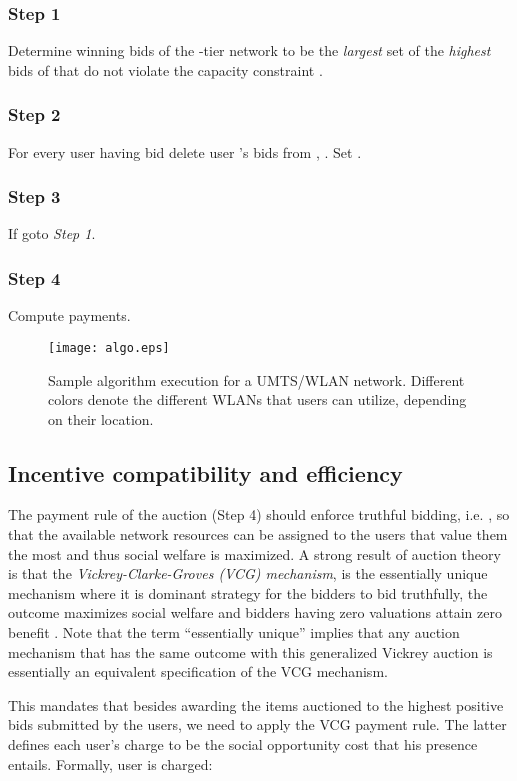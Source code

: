 \documentclass[a4paper]{article}
\begin{document}
\subsubsection*{Step 1} Determine winning bids  of the -tier network  
to be the {\em largest} set of the {\em highest} bids of  that do not violate 
the capacity constraint .
\subsubsection*{Step 2} For every user  having bid  delete 
user 's bids from , .  
Set .
\subsubsection*{Step 3} If  goto {\em Step 1}. 
\subsubsection*{Step 4} Compute payments.

\begin{figure}[htbp]
	\centering\texttt{[image: algo.eps]}
	\caption{Sample algorithm execution for a UMTS/WLAN network. Different
	colors denote the different WLANs that users can utilize, depending on their location.}
	\label{fig:algo}
\end{figure}

\subsection{Incentive compatibility and efficiency}
The payment rule of the auction (Step 4) should enforce truthful bidding,
i.e. , so that the available network resources
can be assigned to the users that value them the most and thus social welfare is maximized. 
A strong result of auction theory is that the {\em Vickrey-Clarke-Groves (VCG) mechanism}, 
is the essentially unique mechanism where it is dominant strategy for the bidders to bid 
truthfully, the outcome maximizes social welfare and bidders having zero valuations 
attain zero benefit \cite{krishna}. Note that the term ``essentially unique'' implies that any 
auction mechanism that has the same outcome with this generalized Vickrey auction is
essentially an equivalent specification of the VCG mechanism.

This mandates that besides awarding the items auctioned to the highest positive bids
submitted by the users, we need to apply the VCG payment rule. The
latter defines each user's charge to be the social opportunity cost that his 
presence entails. Formally, user  is charged:
\end{document}
